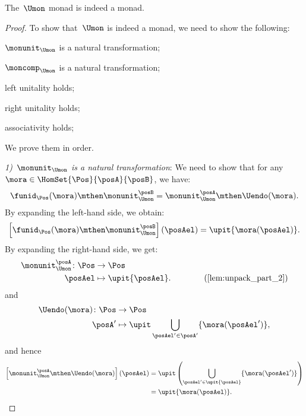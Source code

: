\begin{lemma}
    The~$\Umon$ monad is indeed a monad.
\end{lemma}
\begin{proof}
    To show that~$\Umon$ is indeed a monad, we need to show the following:
    \begin{compactenum}
        \item $\monunit_{\Umon}$ is a natural transformation;
        \item $\moncomp_{\Umon}$ is a natural transformation;
        \item left unitality holds;
        \item right unitality holds;
        \item associativity holds;
    \end{compactenum}
    We prove them in order.

    \emph{1)~$\monunit_{\Umon}$ is a natural transformation}: We need to show that for any~$\mora\in \HomSet{\Pos}{\posA}{\posB}$, we have:
    \begin{equation}
        \funid_{\Pos}(\mora)\mthen \monunit_{\Umon}^\posB=\monunit_{\Umon}^\posA\mthen \Uendo(\mora).
    \end{equation}
    By expanding the left-hand side, we obtain:
    \begin{equation}
        \left[\funid_{\Pos}(\mora)\mthen \monunit_{\Umon}^\posB\right](\posAel)=\upit \{\mora(\posAel)\}.
    \end{equation}
    By expanding the right-hand side, we get:
    \begin{equation}
        \begin{aligned}
            \monunit_{\Umon}^\posA\colon \Pos &\to \Pos\\
            \posAel&\mapsto \upit \{\posAel\}. \qquad \qquad (\cref{lem:unpack_part_2})
        \end{aligned}
    \end{equation}
    and
    \begin{equation}
        \begin{aligned}
            \Uendo(\mora)\colon \Pos &\to \Pos\\
            \posA'&\mapsto \upit \bigcup_{\posAel'\in \posA'}\{\mora(\posAel')\},
        \end{aligned}
    \end{equation}
    and hence
    \begin{equation}
        \begin{aligned}
            \left[\monunit_{\Umon}^\posA\mthen \Uendo(\mora)\right](\posAel)&=\upit \left( \bigcup_{\posAel'\in \upit \{\posAel\}} \{\mora(\posAel')\}\right)\\
            &=\upit \{\mora(\posAel)\}.
        \end{aligned}
    \end{equation}


\end{proof}
